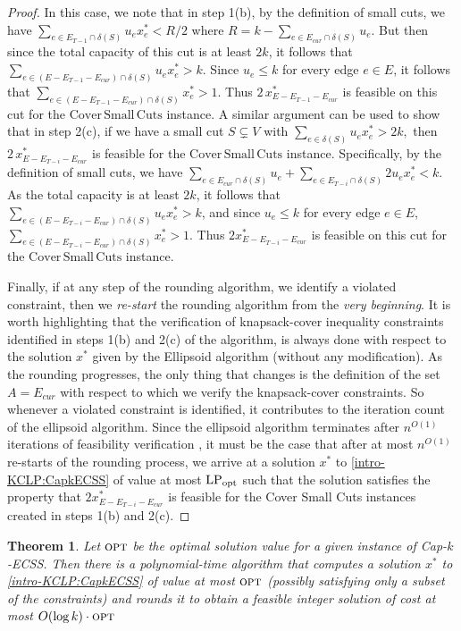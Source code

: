 \documentclass[11pt]{article}
\newtheorem{theorem}{Theorem}
\newcommand\lpopt{\hbox{\text{LP}$_{\text{opt}}$}}
\newcommand{\opt}{\textsc{opt}}
\newcommand\ASC{\mathrm{Cover\,Small\,Cuts}}
\newcommand{\alphatwo}{2}
\begin{document}
{\begin{proof}
In this case, we note that in step 1(b), by the definition of small cuts, we have $\sum_{e\in
E_{T-1} \cap \delta(S)}u_ex^*_e < R/\alphatwo$ where $R = k - \sum_{e\in E_{cur} \cap \delta(S)}u_e$. But then since the total capacity of this cut is at least $2k$, it follows that $\sum_{e\in (E-E_{T-1} - E_{cur}) \cap \delta(S)}
u_e x^*_e > k$. Since $u_e \le k$ for every edge $e \in E$, it follows that $\sum_{e\in (E-E_{T-1} - E_{cur}) \cap \delta(S)} x^*_e > 1$. Thus $\alphatwo\,x^*_{E-E_{T-1} - E_{cur}}$ is feasible on this cut for the $\ASC$ instance. A similar argument can be used to show that in step 2(c), if we have a small cut $S \subsetneq V$ with $ \sum_{e \in \delta(S)} u_e x^*_e > 2k,$ then $\alphatwo\,x^*_{E-E_{T-i}-E_{cur}}$ is feasible for
the $\ASC$ instance. Specifically,
 by the definition of small cuts, we have $\sum_{e \in E_{cur} \cap \delta(S)}u_e + \sum_{e \in E_{T-i} \cap \delta(S)} 2 u_e x^*_e < k$.  As the total capacity is at least $2k$, it follows that $\sum_{e\in (E-E_{T-i} - E_{cur}) \cap \delta(S)} u_ex^*_e > k$, and since $u_e \leq k$ for every edge $e \in E$, $\sum_{e\in (E-E_{T-i} - E_{cur}) \cap \delta(S)} x^*_e > 1$.  Thus $2x^*_{E - E_{T-i} - E_{cur}}$ is feasible on this cut for the $\ASC$ instance.

Finally, if at any step of the rounding algorithm, we identify a violated constraint, then we {\em re-start} the rounding algorithm from the {\em very beginning}. It is worth highlighting that the verification of knapsack-cover inequality constraints identified in steps 1(b) and 2(c) of the algorithm, is always done with respect to the solution $x^*$ given by the Ellipsoid algorithm (without any modification). As the rounding progresses, the only thing that changes is the definition of the set $A = E_{cur}$ with respect to which we verify the knapsack-cover constraints. So whenever a violated constraint is identified, it contributes to the iteration count of the ellipsoid algorithm. Since the ellipsoid algorithm terminates after {$n^{O(1)}$} iterations of feasibility verification \cite{ellipsoid-book}, it must be the case that after at most {$n^{O(1)}$} re-starts of the rounding process, we arrive at a solution $x^*$  to \eqref{intro-KCLP:CapkECSS} of value at most $\lpopt$ such that the solution satisfies the property that $2x^*_{E-E_{T-i} - E_{cur}}$ is feasible for the Cover Small Cuts instances created in steps 1(b) and 2(c).

\end{proof}


\begin{theorem} \label{thm:approx-CapkECSS}
Let $\opt$ be the optimal solution value for a given instance of Cap-$k$-ECSS. Then there is a polynomial-time algorithm that computes a solution $x^*$ to \eqref{intro-KCLP:CapkECSS} of value at most $\opt$ (possibly satisfying only a subset of the constraints) and rounds it to obtain a feasible integer solution of cost at most $O(\log k) \cdot \opt$
\end{theorem}

}
\end{document}
